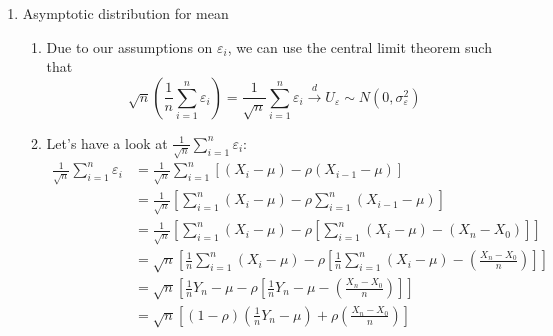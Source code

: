 \documentclass{article}
\begin{document}
\begin{solution}
\begin{enumerate}
  \item Asymptotic distribution for mean
  \begin{enumerate}
    \item Due to our assumptions on $\varepsilon_i$, we can use the central limit theorem such that
        \begin{equation*}
            \sqrt{n} \left(\frac{1}{n} \sum_{i=1}^n \varepsilon_i \right) = \frac{1}{\sqrt{n}} \sum_{i=1}^n \varepsilon_i  \overset{d}{\rightarrow} U_\varepsilon \sim N(0,\sigma_\varepsilon^2)
        \end{equation*}
    \item Let's have a look at $\frac{1}{\sqrt{n}} \sum_{i=1}^n \varepsilon_i$:
        \begin{align*}
        \frac{1}{\sqrt{n}} \sum_{i=1}^n \varepsilon_i
        &= \frac{1}{\sqrt{n}} \sum_{i=1}^n \left[(X_i-\mu)-\rho(X_{i-1}-\mu)\right]\\
        &= \frac{1}{\sqrt{n}} \left[\sum_{i=1}^n (X_i-\mu)- \rho\sum_{i=1}^n(X_{i-1}-\mu)\right]\\
        &= \frac{1}{\sqrt{n}} \left[\sum_{i=1}^n (X_i-\mu)- \rho\left[\sum_{i=1}^n(X_{i}-\mu)-(X_n - X_0)\right]\right]\\
        &= \sqrt{n} \left[\frac{1}{n}\sum_{i=1}^n (X_i-\mu)- \rho\left[\frac{1}{n}\sum_{i=1}^n(X_{i}-\mu)-\left(\frac{X_n - X_0}{n}\right)\right]\right]\\
        &= \sqrt{n} \left[\frac{1}{n}Y_n-\mu- \rho\left[\frac{1}{n}Y_n-\mu-\left(\frac{X_n - X_0}{n}\right)\right]\right]\\
        &= \sqrt{n}\left[(1-\rho)\left(\frac{1}{n}Y_n-\mu\right) + \rho\left(\frac{X_n - X_0}{n}\right)\right]
        \end{align*}


\end{enumerate}
\end{enumerate}
\end{solution}
\end{document}
